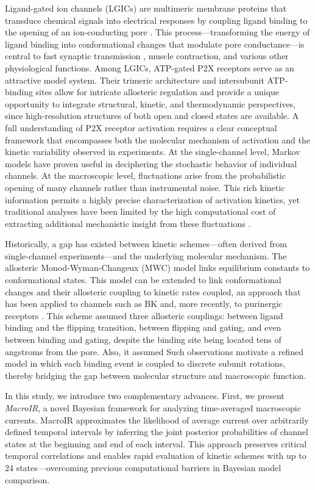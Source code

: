 \documentclass[pdflatex,sn-mathphys-num]{sn-jnl}%
\theoremstyle{thmstyleone}%
\theoremstyle{thmstyletwo}%
\theoremstyle{thmstylethree}%
\begin{document}
Ligand-gated ion channels (LGICs) are multimeric membrane proteins that transduce chemical signals into electrical responses by coupling ligand binding to the opening of an ion‐conducting pore \cite{Changeux1984AcetylcholineRA}. This process—transforming the energy of ligand binding into conformational changes that modulate pore conductance—is central to fast synaptic transmission \cite{greengard2001neurobiology}, muscle contraction, and various other physiological functions. Among LGICs, ATP-gated P2X receptors serve as an attractive model system. Their trimeric architecture and intersubunit ATP-binding sites allow for intricate allosteric regulation and provide a unique opportunity to integrate structural, kinetic, and thermodynamic perspectives, since high-resolution structures of both open and closed states are available. A full understanding of P2X receptor activation requires a clear conceptual framework that encompasses both the molecular mechanism of activation and the kinetic variability observed in experiments. At the single-channel level, Markov models have proven useful in deciphering the stochastic behavior of individual channels. At the macroscopic level, fluctuations arise from the probabilistic opening of many channels rather than instrumental noise. This rich kinetic information permits a highly precise characterization of activation kinetics, yet traditional analyses have been limited by the high computational cost of extracting additional mechanistic insight from these fluctuations \cite{Moffatt}.

Historically, a gap has existed between kinetic schemes—often derived from single-channel experiments—and the underlying molecular mechanism. The allosteric Monod-Wyman-Changeux (MWC) model links equilibrium constants to conformational states. This model can be extended to link conformational changes and their allosteric coupling to kinetic rates coupled, an approach that has been applied to channels such as BK \cite{Horrigan2002CouplingBV} and, more recently, to purinergic receptors \cite{Moffatt_hume}. This scheme assumed three allosteric couplings: between ligand binding and the flipping transition, between flipping and gating, and even between binding and gating, despite the binding site being located tens of angstroms from the pore. Also, it assumed Such observations motivate a refined model in which each binding event is coupled to discrete subunit rotations, thereby bridging the gap between molecular structure and macroscopic function.

In this study, we introduce two complementary advances. First, we present \textit{MacroIR}, a novel Bayesian framework for analyzing time-averaged macroscopic currents. MacroIR approximates the likelihood of average current over arbitrarily defined temporal intervals by inferring the joint posterior probabilities of channel states at the beginning and end of each interval. This approach preserves critical temporal correlations and enables rapid evaluation of kinetic schemes with up to 24 states—overcoming previous computational barriers in Bayesian model comparison.
\end{document}
